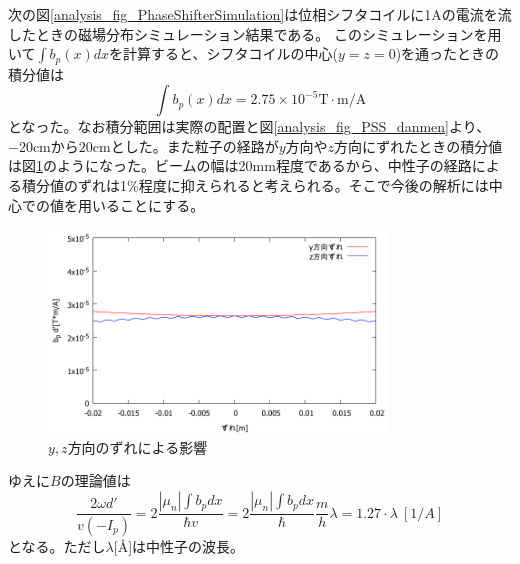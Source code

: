 次の図\ref{analysis_fig_PhaseShifterSimulation}は位相シフタコイルに1Aの電流を流したときの磁場分布シミュレーション結果である。%
このシミュレーションを用いて$\int b_p(x) dx$を計算すると、シフタコイルの中心($y=z=0$)を通ったときの積分値は
\begin{equation}
\int b_p(x) dx =2.75 \times 10^{-5} \mathrm{T\cdot m/A}
\end{equation}
となった。なお積分範囲は実際の配置と図\ref{analysis_fig_PSS_danmen}より、$-20$cmから$20$cmとした。また粒子の経路が$y$方向や$z$方向にずれたときの積分値は図\ref{analysis_fig_PSS_zure}のようになった。ビームの幅は20mm程度であるから、中性子の経路による積分値のずれは1\%程度に抑えられると考えられる。そこで今後の解析には中心での値を用いることにする。
\begin{figure}[h]
\centering
\includegraphics[width=9cm]{analysis/B/bd.pdf}
\caption{$y,z$方向のずれによる影響} \label{analysis_fig_PSS_zure}
\vspace{-5mm}
\end{figure}

ゆえに$B$の理論値は
\begin{equation}
\frac{2\omega d'}{v(-I_p)}=2\frac{|\mu_n|\int b_p dx}{\hbar v}=2\frac{|\mu_n|\int b_p dx}{\hbar}\frac{m}{h}\lambda=1.27 \cdot \lambda \ [1/A] \label{analysis_theory_B}
\end{equation}
となる。ただし$\lambda$[\AA]は中性子の波長。 

